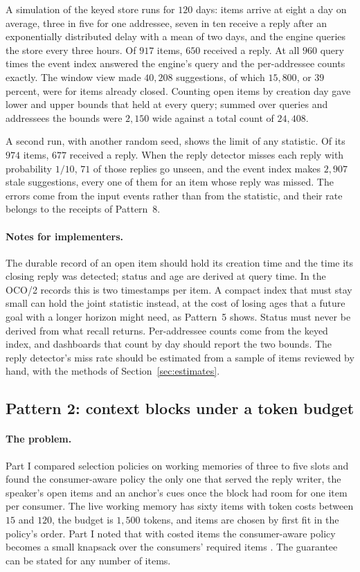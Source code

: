\documentclass[11pt]{article}
\theoremstyle{definition}
\theoremstyle{plain}
\begin{document}
A simulation of the keyed store runs for $120$ days: items arrive at eight a day on average, three
in five for one addressee, seven in ten receive a reply after an exponentially distributed delay
with a mean of two days, and the engine queries the store every three hours. Of $917$ items, $650$
received a reply. At all $960$ query times the event index answered the engine's query and the
per-addressee counts exactly. The window view made $40{,}208$ suggestions, of which $15{,}800$, or
$39$ percent, were for items already closed. Counting open items by creation day gave lower and
upper bounds that held at every query; summed over queries and addressees the bounds were $2{,}150$
wide against a total count of $24{,}408$.

A second run, with another random seed, shows the limit of any statistic. Of its $974$ items,
$677$ received a reply. When the reply detector misses each reply with probability $1/10$, $71$ of
those replies go unseen, and the event index makes $2{,}907$ stale suggestions, every one of them
for an item whose reply was missed. The errors come from the input
events rather than from the statistic, and their rate belongs to the receipts of Pattern~8.

\paragraph{Notes for implementers.} The durable record of an open item should hold its creation
time and the time its closing reply was detected; status and age are derived at query time. In the
OCO/2 records this is two timestamps per item. A compact index that must stay small can hold the
joint statistic instead, at the cost of losing ages that a future goal with a longer horizon might
need, as Pattern~5 shows. Status must never be derived from what recall returns. Per-addressee
counts come from the keyed index, and dashboards that count by day should report the two bounds.
The reply detector's miss rate should be estimated from a sample of items reviewed by hand, with
the methods of Section~\ref{sec:estimates}.

\subsection{Pattern 2: context blocks under a token budget}\label{sec:lp2}

\paragraph{The problem.} Part I compared selection policies on working memories of three to five
slots and found the consumer-aware policy the only one that served the reply writer, the speaker's
open items and an anchor's cues once the block had room for one item per consumer. The live working
memory has sixty items with token costs between $15$ and $120$, the budget is $1{,}500$ tokens, and
items are chosen by first fit in the policy's order. Part I noted that with costed items the
consumer-aware policy becomes a small knapsack over the consumers' required items
\cite[Section~5.4]{part1}. The guarantee can be stated for any number of items.
\end{document}
